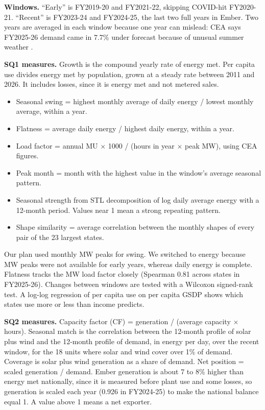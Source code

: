 \documentclass[10pt,a4paper]{article}
\begin{document}
\textbf{Windows.} ``Early'' is FY2019-20 and FY2021-22, skipping COVID-hit FY2020-21. ``Recent'' is FY2023-24 and FY2024-25, the last two full years in Ember. Two years are averaged in each window because one year can mislead: CEA says FY2025-26 demand came in 7.7\% under forecast because of unusual summer weather \cite{lgbr2627}.

\textbf{SQ1 measures.} Growth is the compound yearly rate of energy met. Per capita use divides energy met by population, grown at a steady rate between 2011 and 2026. It includes losses, since it is energy met and not metered sales.
\begin{itemize}
\item Seasonal swing = highest monthly average of daily energy / lowest monthly average, within a year.
\item Flatness = average daily energy / highest daily energy, within a year.
\item Load factor = annual MU $\times$ 1000 / (hours in year $\times$ peak MW), using CEA figures.
\item Peak month = month with the highest value in the window's average seasonal pattern.
\item Seasonal strength from STL decomposition \cite{stl} of log daily average energy with a 12-month period. Values near 1 mean a strong repeating pattern.
\item Shape similarity = average correlation between the monthly shapes of every pair of the 23 largest states.
\end{itemize}
Our plan used monthly MW peaks for swing. We switched to energy because MW peaks were not available for early years, whereas daily energy is complete. Flatness tracks the MW load factor closely (Spearman 0.81 across states in FY2025-26). Changes between windows are tested with a Wilcoxon signed-rank test. A log-log regression of per capita use on per capita GSDP shows which states use more or less than income predicts.

\textbf{SQ2 measures.} Capacity factor (CF) = generation / (average capacity $\times$ hours). Seasonal match is the correlation between the 12-month profile of solar plus wind and the 12-month profile of demand, in energy per day, over the recent window, for the 18 units where solar and wind cover over 1\% of demand. Coverage is solar plus wind generation as a share of demand. Net position = scaled generation / demand. Ember generation is about 7 to 8\% higher than energy met nationally, since it is measured before plant use and some losses, so generation is scaled each year (0.926 in FY2024-25) to make the national balance equal 1. A value above 1 means a net exporter.
\end{document}
